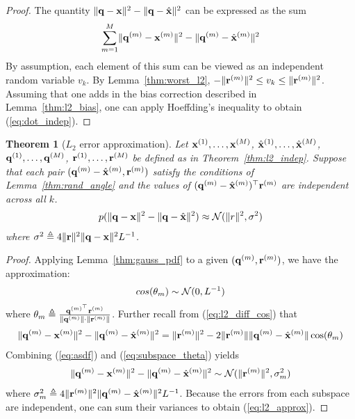 \documentclass[]{article}
\newtheorem{theorem}{Theorem}[section]
\begin{document}
\begin{proof}
The quantity $\lVert\mathbf{q} - \mathbf{x}\rVert^2 - \lVert\mathbf{q} - \hat{\mathbf{x}}\rVert^2$ can be expressed as the sum
\begin{align}
    \sum_{m=1}^M \lVert\mathbf{q}^{(m)} - \mathbf{x}^{(m)} \rVert^2 - \lVert\mathbf{q}^{(m)} - \hat{\mathbf{x}}^{(m)} \rVert^2
\end{align}
By assumption, each element of this sum can be viewed as an independent random variable $v_k$. By Lemma~\ref{thm:worst_l2}, $-\lVert\mathbf{r}^{(m)}\rVert^2 \le v_k \le \lVert\mathbf{r}^{(m)}\rVert^2$. Assuming that one adds in the bias correction described in Lemma~\ref{thm:l2_bias}, one can apply Hoeffding's inequality to obtain (\ref{eq:dot_indep}).
\end{proof}


\begin{theorem}[$L_2$ error approximation] \label{thm:l2_approx}
Let $\mathbf{x}^{(1)},\ldots,\mathbf{x}^{(M)}$, $\hat{\mathbf{x}}^{(1)},\ldots,\hat{\mathbf{x}}^{(M)}$, \\ $\mathbf{q}^{(1)},\ldots,\mathbf{q}^{(M)}$, $\mathbf{r}^{(1)},\ldots,\mathbf{r}^{(M)}$ be defined as in Theorem~\ref{thm:l2_indep}. Suppose that each pair $(\mathbf{q}^{(m)} - \hat{\mathbf{x}}^{(m)}, \mathbf{r}^{(m)})$ satisfy the conditions of Lemma~\ref{thm:rand_angle} and the values of $(\mathbf{q}^{(m)} - \hat{\mathbf{x}}^{(m)})^\top \mathbf{r}^{(m)}$ are independent across all $k$.
\begin{align} \label{eq:l2_approx}
    p(\lVert\mathbf{q} - \mathbf{x}\rVert^2 - \lVert\mathbf{q} - \hat{\mathbf{x}}\rVert^2) \approx \operatorname{\mathcal{N}}(\lVert r\rVert^2, \sigma^2)
\end{align}
where $\sigma^2 \triangleq 4 \lVert\mathbf{r}\rVert^2\lVert\mathbf{q} - \mathbf{x}\rVert^2 L^{-1}$.
\end{theorem}

\begin{proof}
Applying Lemma~\ref{thm:gauss_pdf} to a given $(\mathbf{q}^{(m)}, \mathbf{r}^{(m)})$, we have the approximation:
\begin{align} \label{eq:subspace_theta}
    cos(\theta_m) \sim \operatorname{\mathcal{N}}(0, L^{-1})
\end{align}
where $\theta_m \triangleq \frac{ \mathbf{q}^{(m)^\top}\mathbf{r}^{(m)} }{ \lVert\mathbf{q}^{(m)}\rVert \cdot \lVert\mathbf{r}^{(m)}\rVert }$. Further recall from (\ref{eq:l2_diff_cos}) that
\begin{align} \label{eq:asdf}
    \lVert\mathbf{q}^{(m)} - \mathbf{x}^{(m)}\rVert^2 - \lVert\mathbf{q}^{(m)} - \hat{\mathbf{x}}^{(m)}\rVert^2 = \lVert\mathbf{r}^{(m)}\rVert^2 - 2\lVert\mathbf{r}^{(m)}\rVert\lVert\mathbf{q}^{(m)} - \hat{\mathbf{x}}^{(m)}\rVert\cos(\theta_m)
\end{align}
Combining (\ref{eq:asdf}) and (\ref{eq:subspace_theta}) yields
\begin{align}
    \lVert\mathbf{q}^{(m)} - \mathbf{x}^{(m)}\rVert^2 - \lVert\mathbf{q}^{(m)} - \hat{\mathbf{x}}^{(m)}\rVert^2 \sim \mathcal{N}(\lVert\mathbf{r}^{(m)}\rVert^2, \sigma_m^2)
\end{align}
where $\sigma_m^2 \triangleq 4 \lVert\mathbf{r}^{(m)}\rVert^2\lVert\mathbf{q}^{(m)} - \hat{\mathbf{x}}^{(m)}\rVert^2 L^{-1}$. Because the errors from each subspace are independent, one can sum their variances to obtain (\ref{eq:l2_approx}).

\end{proof}


% 
% 


\end{document}
